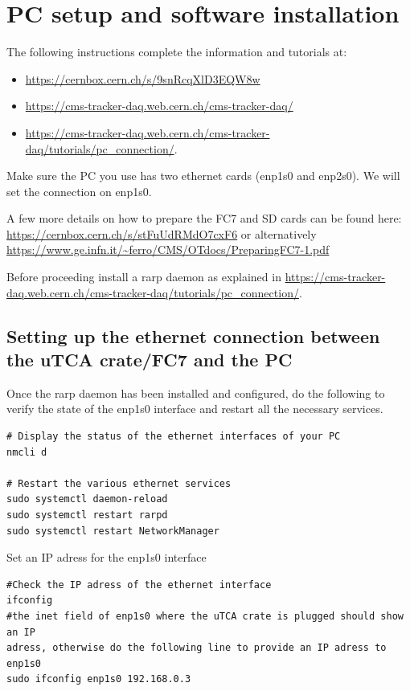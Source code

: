 \documentclass[10pt,a4paper]{article}
\begin{document}
\section{PC setup and software installation}

The following instructions complete the information and tutorials at:
\begin{itemize}
\item \url{https://cernbox.cern.ch/s/9snRcqXlD3EQW8w} \label{PatrykInstructions}
\item \url{https://cms-tracker-daq.web.cern.ch/cms-tracker-daq/} 
\item \url{https://cms-tracker-daq.web.cern.ch/cms-tracker-daq/tutorials/pc_connection/}.
\end{itemize}
Make sure the PC you use has two ethernet cards (enp1s0 and enp2s0). We will set the connection on enp1s0.

A few more details on how to prepare the FC7 and SD cards can be found here:
\url{https://cernbox.cern.ch/s/stFuUdRMdO7cxF6} or alternatively \url{https://www.ge.infn.it/~ferro/CMS/OTdocs/PreparingFC7-1.pdf}

Before proceeding install a rarp daemon as explained in \url{https://cms-tracker-daq.web.cern.ch/cms-tracker-daq/tutorials/pc_connection/}.

\subsection{Setting up the ethernet connection between the uTCA crate/FC7 and the PC} 
\label{fc7connection}
Once the rarp daemon has been installed and configured, do the following to verify the state of the enp1s0 interface and restart all the necessary services.
\begin{framed}
\begin{verbatim}
# Display the status of the ethernet interfaces of your PC
nmcli d 

# Restart the various ethernet services
sudo systemctl daemon-reload
sudo systemctl restart rarpd
sudo systemctl restart NetworkManager
\end{verbatim}
\end{framed}

Set an IP adress for the enp1s0 interface
\begin{framed}
\begin{verbatim}
#Check the IP adress of the ethernet interface
ifconfig 
#the inet field of enp1s0 where the uTCA crate is plugged should show an IP 
adress, otherwise do the following line to provide an IP adress to enp1s0
sudo ifconfig enp1s0 192.168.0.3  
\end{verbatim}
\end{framed}
\end{document}

